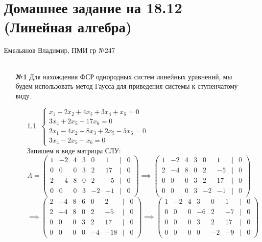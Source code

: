 \documentclass[a4paper]{article}
\newcommand{\case}[1]{\begin{cases} #1 \end{cases}}
\begin{document}
\section*{Домашнее задание на 18.12 (Линейная алгебра)}
 {\large Емельянов Владимир, ПМИ гр №247}\\\\
\begin{enumerate}
    \item[\textbf{№1}]Для нахождения ФСР однородных систем линейных уравнений, мы будем использовать метод Гаусса для приведения системы к ступенчатому виду. 
    \begin{enumerate}
        \item[1.1.]$
        \case{
        x_{1}-2 x_{2}+4 x_{3}+3 x_{4}+x_{6}  =0 \\
        3 x_{4}+2 x_{5}+17 x_{6}  =0 \\
        2 x_{1}-4 x_{2}+8 x_{3}+2 x_{5}-5 x_{6}  =0  \\
        3 x_{4}-2 x_{5}-x_{6}  =0 
        }
        $\\
        Запишем в виде матрицы СЛУ:
        $$A =
        \begin{pmatrix}
        1 & -2 & 4 & 3 & 0 & 1 & | & 0 \\
        0 & 0 & 0 & 3 & 2 & 17 & | & 0 \\
        2 & -4 & 8 & 0 & 2 & -5 & | & 0 \\
        0 & 0 & 0 & 3 & -2 & -1 & | & 0
        \end{pmatrix}
        \implies\begin{pmatrix}
            1 & -2 & 4 & 3 & 0 & 1 & | & 0 \\
            2 & -4 & 8 & 0 & 2 & -5 & | & 0 \\
            0 & 0 & 0 & 3 & 2 & 17 & | & 0 \\
            0 & 0 & 0 & 3 & -2 & -1 & | & 0
            \end{pmatrix}$$
        $$
        \implies\begin{pmatrix}
            2 & -4 & 8 & 6 & 0 & 2 & | & 0 \\
            2 & -4 & 8 & 0 & 2 & -5 & | & 0 \\
            0 & 0 & 0 & 3 & 2 & 17 & | & 0 \\
            0 & 0 & 0 & 0 & -4 & -18 & | & 0
            \end{pmatrix}
        \implies \begin{pmatrix}
            1 & -2 & 4 & 3 & 0 & 1 & | & 0 \\
            0 & 0 & 0 & -6 & 2 & -7 & | & 0 \\
            0 & 0 & 0 & 3 & 2 & 17 & | & 0 \\
            0 & 0 & 0 & 0 & -2 & -9 & | & 0
            \end{pmatrix}$$
        

\end{enumerate}
\end{enumerate}
\end{document}
